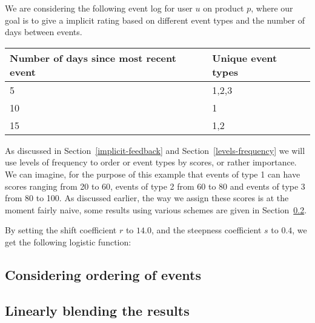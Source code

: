 We are considering the following event log for user $u$ on product $p$, where
our goal is to give a implicit rating based on different event types and the
number of days between events.

\begin{table}[h!]
  \begin{tabular}{p{4cm}m{3cm}}
    \toprule
    Number of days since most recent event & Unique event types \\
    \midrule
    5 & 1,2,3 \\
    10 & 1 \\
    15 & 1,2 \\
    \bottomrule
  \end{tabular}
\end{table}

As discussed in Section~\ref{implicit-feedback} and
Section~\ref{levels-frequency} we will use levels of frequency to order or
event types by scores, or rather importance. We can imagine, for the purpose of
this example that events of type 1 can have scores ranging from 20 to 60,
events of type 2 from 60 to 80 and events of type 3 from 80 to 100. As
discussed earlier, the way we assign these scores is at the moment fairly
naive, some results using various schemes are given in Section~\ref{}.

By setting the shift coefficient $r$ to $14.0$, and the steepness coefficient
$s$ to $0.4$, we get the following logistic function:

\begin{figure}[h!]
  \centering
\end{figure}


\subsection{Considering ordering of events}

\subsection{Linearly blending the results}
